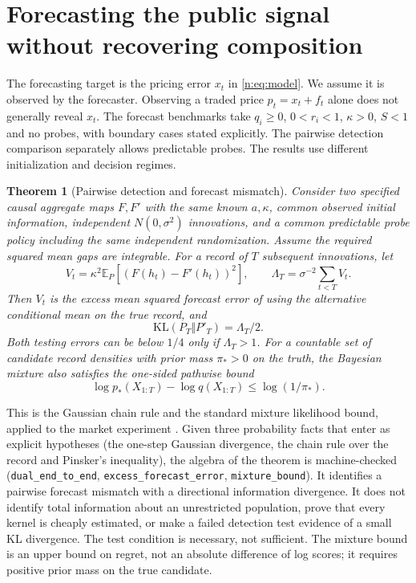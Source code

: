 \documentclass[12pt]{article}
\newtheorem{theorem}{Theorem}[section]
\theoremstyle{definition}
\theoremstyle{remark}
\begin{document}
\section{Forecasting the public signal without recovering composition}\label{n:irr_sec}

The forecasting target is the pricing error $x_t$ in \eqref{n:eq:model}. We assume it is observed by the forecaster. Observing a traded price $p_t=x_t+f_t$ alone does not generally reveal $x_t$. The forecast benchmarks take $q_i\ge0$, $0<r_i<1$, $\kappa>0$, $S<1$ and no probes, with boundary cases stated explicitly. The pairwise detection comparison separately allows predictable probes. The results use different initialization and decision regimes.


\begin{theorem}[Pairwise detection and forecast mismatch]\label{n:dual}
Consider two specified causal aggregate maps $F,F'$ with the same known $a,\kappa$, common observed initial information, independent $N(0,\sigma^2)$ innovations, and a common predictable probe policy including the same independent randomization. Assume the required squared mean gaps are integrable. For a record of $T$ subsequent innovations, let
\[
V_t=\kappa^2\mathbb E_P[(F(h_t)-F'(h_t))^2],\qquad
\Lambda_T=\sigma^{-2}\sum_{t<T}V_t.
\]
Then $V_t$ is the excess mean squared forecast error of using the alternative conditional mean on the true record, and
\[
\mathrm{KL}(P_T\Vert P'_T)=\Lambda_T/2.
\]
Both testing errors can be below $1/4$ only if $\Lambda_T>1$.
For a countable set of candidate record densities with prior mass $\pi_*>0$ on the truth, the Bayesian mixture also satisfies the one-sided pathwise bound
\[
\log p_*(X_{1:T})-\log q(X_{1:T})\le\log(1/\pi_*).
\]
\end{theorem}

This is the Gaussian chain rule and the standard mixture likelihood bound, applied to the market experiment \citep{dawid1984,vovk2001}. Given three probability facts that enter as explicit hypotheses (the one-step Gaussian divergence, the chain rule over the record and Pinsker's inequality), the algebra of the theorem is machine-checked (\nolinkurl{dual_end_to_end}, \nolinkurl{excess_forecast_error}, \nolinkurl{mixture_bound}). It identifies a pairwise forecast mismatch with a directional information divergence. It does not identify total information about an unrestricted population, prove that every kernel is cheaply estimated, or make a failed detection test evidence of a small KL divergence. The test condition is necessary, not sufficient. The mixture bound is an upper bound on regret, not an absolute difference of log scores; it requires positive prior mass on the true candidate.
\end{document}
